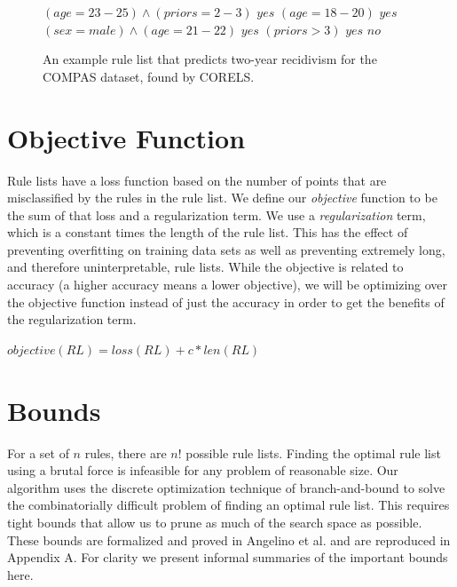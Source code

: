 \begin{figure}[t!]
\begin{algorithmic}
\normalsize
\State \bif $(age=23-25) \wedge (priors=2-3)$ \bthen $yes$
\State \belif $(age=18-20)$ \bthen $yes$
\State \belif $(sex=male) \wedge (age=21-22)$ \bthen $yes$
\State \belif $(priors>3)$ \bthen $yes$
\State \belse $no$
\end{algorithmic}
\caption{An example rule list that predicts two-year recidivism for the COMPAS dataset, found by CORELS.}
\label{fig:rule-list}
\end{figure}

\section{Objective Function}
Rule lists have a loss function based on the number of points that are misclassified by the rules in the rule list.
We define our \textit{objective} function to be the sum of that loss and a regularization term.
We use a \textit{regularization} term, which is a constant times the length of the rule list.
This has the effect of preventing overfitting on training data sets as well as preventing extremely long, and therefore uninterpretable, rule lists.
While the objective is related to accuracy (a higher accuracy means a lower objective), we will be optimizing over the objective function instead of just the accuracy in order to get the benefits of the regularization term.

\begin{math}
objective(RL) = loss(RL) + c * len(RL)
\end{math}

\section{Bounds}\label{sec:bounds}
For a set of $n$ rules, there are $n!$ possible rule lists.
Finding the optimal rule list using a brutal force is infeasible for any problem of reasonable size.
Our algorithm uses the discrete optimization technique of branch-and-bound to solve the combinatorially difficult problem of finding an optimal rule list.
This requires tight bounds that allow us to prune as much of the search space as possible.
These bounds are formalized and proved in Angelino et al. \cite{AngelinoLaAlSeRu17} and are reproduced in Appendix A.
For clarity we present informal summaries of the important bounds here.

